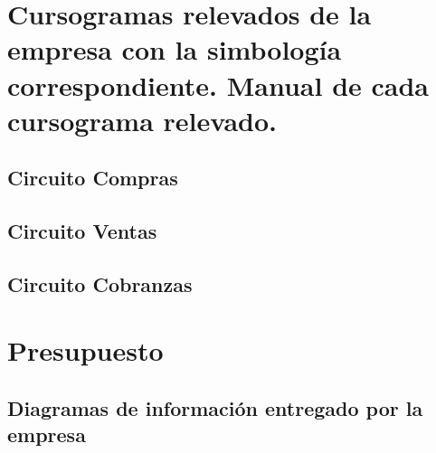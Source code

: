 \documentclass[12pt,titlepage]{report}
\begin{document}
\part{Cursogramas relevados de la empresa con la simbología correspondiente. Manual de cada cursograma relevado.}

\chapter{Circuito Compras}

\chapter{Circuito Ventas}

\chapter{Circuito Cobranzas}


\part{Presupuesto}


\appendix
\chapter{Diagramas de información entregado por la empresa}


\end{document}

